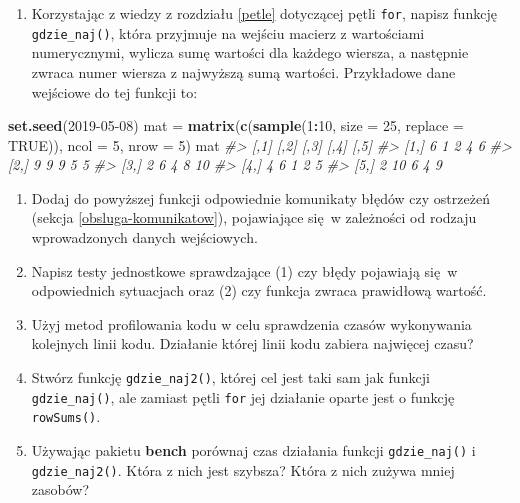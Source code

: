 \documentclass[paper=6in:9in,pagesize=pdftex,headinclude=on,footinclude=on,10pt]{scrbook}
\newenvironment{Shaded}{\begin{snugshade}}{\end{snugshade}}
\newcommand{\CommentTok}[1]{\textcolor[rgb]{0.56,0.35,0.01}{\textit{#1}}}
\newcommand{\DataTypeTok}[1]{\textcolor[rgb]{0.13,0.29,0.53}{#1}}
\newcommand{\DecValTok}[1]{\textcolor[rgb]{0.00,0.00,0.81}{#1}}
\newcommand{\KeywordTok}[1]{\textcolor[rgb]{0.13,0.29,0.53}{\textbf{#1}}}
\newcommand{\NormalTok}[1]{#1}
\newcommand{\OperatorTok}[1]{\textcolor[rgb]{0.81,0.36,0.00}{\textbf{#1}}}
\newcommand{\OtherTok}[1]{\textcolor[rgb]{0.56,0.35,0.01}{#1}}
\newcommand{\StringTok}[1]{\textcolor[rgb]{0.31,0.60,0.02}{#1}}
\providecommand{\tightlist}{%
  \setlength{\itemsep}{0pt}\setlength{\parskip}{0pt}}
\begin{document}
\begin{enumerate}
\def\labelenumi{\arabic{enumi})}
\tightlist
\item
  Korzystając z wiedzy z rozdziału \ref{petle} dotyczącej pętli \texttt{for}, napisz funkcję \texttt{gdzie\_naj()}, która przyjmuje na wejściu macierz z wartościami numerycznymi, wylicza sumę wartości dla każdego wiersza, a następnie zwraca numer wiersza z najwyższą sumą wartości.
  Przykładowe dane wejściowe do tej funkcji to:
\end{enumerate}

\begin{Shaded}
\begin{Highlighting}[]
\KeywordTok{set.seed}\NormalTok{(}\DecValTok{2019-05-08}\NormalTok{)}
\NormalTok{mat =}\StringTok{ }\KeywordTok{matrix}\NormalTok{(}\KeywordTok{c}\NormalTok{(}\KeywordTok{sample}\NormalTok{(}\DecValTok{1}\OperatorTok{:}\DecValTok{10}\NormalTok{, }\DataTypeTok{size =} \DecValTok{25}\NormalTok{, }\DataTypeTok{replace =} \OtherTok{TRUE}\NormalTok{)),}
             \DataTypeTok{ncol =} \DecValTok{5}\NormalTok{, }\DataTypeTok{nrow =} \DecValTok{5}\NormalTok{)}
\NormalTok{mat}
\CommentTok{#>      [,1] [,2] [,3] [,4] [,5]}
\CommentTok{#> [1,]    6    1    2    4    6}
\CommentTok{#> [2,]    9    9    9    5    5}
\CommentTok{#> [3,]    2    6    4    8   10}
\CommentTok{#> [4,]    4    6    1    2    5}
\CommentTok{#> [5,]    2   10    6    4    9}
\end{Highlighting}
\end{Shaded}

\begin{enumerate}
\def\labelenumi{\arabic{enumi})}
\item
  Dodaj do powyższej funkcji odpowiednie komunikaty błędów czy ostrzeżeń (sekcja \ref{obsluga-komunikatow}), pojawiające się~w zależności od rodzaju wprowadzonych danych wejściowych.
\item
  Napisz testy jednostkowe sprawdzające (1) czy błędy pojawiają się~w odpowiednich sytuacjach oraz (2) czy funkcja zwraca prawidłową wartość.
\item
  Użyj metod profilowania kodu w celu sprawdzenia czasów wykonywania kolejnych linii kodu.
  Działanie której linii kodu zabiera najwięcej czasu?
\item
  Stwórz funkcję \texttt{gdzie\_naj2()}, której cel jest taki sam jak funkcji \texttt{gdzie\_naj()}, ale zamiast pętli \texttt{for} jej działanie oparte jest o funkcję \texttt{rowSums()}.
\item
  Używając pakietu \textbf{bench} porównaj czas działania funkcji \texttt{gdzie\_naj()} i \texttt{gdzie\_naj2()}.
  Która z nich jest szybsza?
  Która z nich zużywa mniej zasobów?
\end{enumerate}
\end{document}
